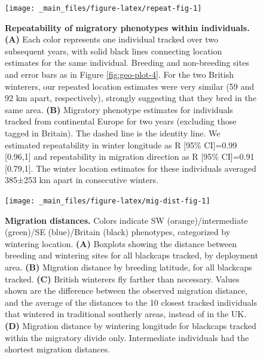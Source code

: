 \documentclass[a4paper, twoside]{templates/ociamthesis}
\begin{document}
\begin{figure}
\texttt{[image: \_main\_files/figure-latex/repeat-fig-1]} \caption{\textbf{Repeatability of migratory phenotypes within individuals.} \textbf{(A)} Each color represents one individual tracked over two subsequent years, with solid black lines connecting location estimates for the same individual. Breeding and non-breeding sites and error bars as in Figure \ref{fig:geo-plot-4}. For the two British winterers, our repeated location estimates were very similar (59 and 92 km apart, respectively), strongly suggesting that they bred in the same area. \textbf{(B)} Migratory phenotype estimates for individuals tracked from continental Europe for two years (excluding those tagged in Britain). The dashed line is the identity line. We estimated repeatability in winter longitude as R {[}95\% CI{]}=0.99 {[}0.96,1{]} and repeatability in migration direction as R {[}95\% CI{]}=0.91 {[}0.79,1{]}. The winter location estimates for these individuals averaged 385±253 km apart in consecutive winters.}\label{fig:repeat-fig}
\end{figure}



\begin{figure}
\texttt{[image: \_main\_files/figure-latex/mig-dist-fig-1]} \caption{\textbf{Migration distances.} Colors indicate SW (orange)/intermediate (green)/SE (blue)/Britain (black) phenotypes, categorized by wintering location. \textbf{(A)} Boxplots showing the distance between breeding and wintering sites for all blackcaps tracked, by deployment area. \textbf{(B)} Migration distance by breeding latitude, for all blackcaps tracked. \textbf{(C)} British winterers fly farther than necessary. Values shown are the difference between the observed migration distance, and the average of the distances to the 10 closest tracked individuals that wintered in traditional southerly areas, instead of in the UK. \textbf{(D)} Migration distance by wintering longitude for blackcaps tracked within the migratory divide only. Intermediate individuals had the shortest migration distances.}\label{fig:mig-dist-fig}
\end{figure}
\end{document}

